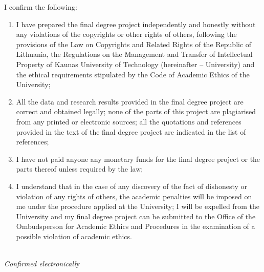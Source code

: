 \begin{titlepage}
             
             \footnotesize
I confirm the following: 
\begin{enumerate}
	\item I have prepared the final degree project independently and honestly without any violations of the copyrights or other rights of others, following the provisions of the Law on Copyrights and Related Rights of the Republic of Lithuania, the Regulations on the Management and Transfer of Intellectual Property of Kaunas University of Technology (hereinafter – University) and the ethical requirements stipulated by the Code of Academic Ethics of the University; 
	\item All the data and research results provided in the final degree project are correct and obtained legally; none of the parts of this project are plagiarised from any printed or electronic sources; all the quotations and references provided in the text of the final degree project are indicated in the list of references;
	\item I have not paid anyone any monetary funds for the final degree project or the parts thereof unless required by the law;
	\item I understand that in the case of any discovery of the fact of dishonesty or violation of any rights of others, the academic penalties will be imposed on me under the procedure applied at the University; I will be expelled from the University and my final degree project can be submitted to the Office of the Ombudsperson for Academic Ethics and Procedures in the examination of a possible violation of academic ethics.
\end{enumerate}

             \begin{flushright}
             \projectAuthorName \\
             \textit{Confirmed electronicall}y
	
             \end{flushright}

             
             
       \vfill

\end{titlepage}